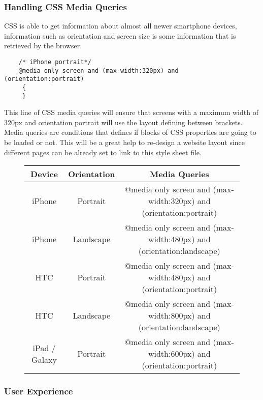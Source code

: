 \subsubsection{Handling CSS Media Queries}  %

CSS is able to get information about almost all newer smartphone devices, information such as orientation and screen size is some information that is retrieved by the browser.\\
\begin{lstlisting}
	/* iPhone portrait*/
	@media only screen and (max-width:320px) and (orientation:portrait)
	 {
	 }
\end{lstlisting}
This line of CSS media queries will ensure that screens with a maximum width of 320px and orientation portrait will use the layout defining between brackets. Media queries are conditions that defines if blocks of CSS properties are going to be loaded or not. This will be a great help to re-design a website layout since different pages can be already set to link to this style sheet file. \\

\begin{figure}[!h]
	\begin{tabular}{| c | c | c |}
	\hline
	\textbf{Device} & \textbf{Orientation} & \textbf{Media Queries} \\ \hline
	iPhone & Portrait & @media only screen and (max-width:320px) and (orientation:portrait)\\ \hline
	iPhone & Landscape & @media only screen and (max-width:480px) and (orientation:landscape)\\ \hline
	HTC & Portrait & @media only screen and (max-width:480px) and (orientation:portrait)\\ \hline
	HTC & Landscape & @media only screen and (max-width:800px) and (orientation:landscape)\\ \hline
	iPad / Galaxy & Portrait & @media only screen and (max-width:600px) and (orientation:portrait)\\
	\hline
	\end{tabular}
\end{figure}

\subsubsection{User Experience}	    %


